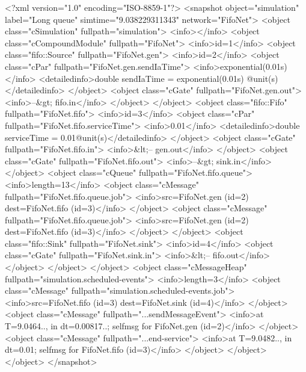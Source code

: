 \begin{filelisting}
<?xml version="1.0" encoding="ISO-8859-1"?>
<snapshot object="simulation" label="Long queue" simtime="9.038229311343"
network="FifoNet">
  <object class="cSimulation" fullpath="simulation">
    <info></info>
    <object class="cCompoundModule" fullpath="FifoNet">
      <info>id=1</info>
      <object class="fifo::Source" fullpath="FifoNet.gen">
        <info>id=2</info>
        <object class="cPar" fullpath="FifoNet.gen.sendIaTime">
          <info>exponential(0.01s)</info>
          <detailedinfo>double sendIaTime = exponential(0.01s) @unit(s)
          </detailedinfo>
        </object>
        <object class="cGate" fullpath="FifoNet.gen.out">
          <info>--&gt; fifo.in</info>
        </object>
      </object>
      <object class="fifo::Fifo" fullpath="FifoNet.fifo">
        <info>id=3</info>
        <object class="cPar" fullpath="FifoNet.fifo.serviceTime">
          <info>0.01</info>
          <detailedinfo>double serviceTime = 0.01@unit(s)</detailedinfo>
        </object>
        <object class="cGate" fullpath="FifoNet.fifo.in">
          <info>&lt;-- gen.out</info>
        </object>
        <object class="cGate" fullpath="FifoNet.fifo.out">
          <info>--&gt; sink.in</info>
        </object>
        <object class="cQueue" fullpath="FifoNet.fifo.queue">
          <info>length=13</info>
          <object class="cMessage" fullpath="FifoNet.fifo.queue.job">
            <info>src=FifoNet.gen (id=2)  dest=FifoNet.fifo (id=3)</info>
          </object>
          <object class="cMessage" fullpath="FifoNet.fifo.queue.job">
            <info>src=FifoNet.gen (id=2)  dest=FifoNet.fifo (id=3)</info>
          </object>
        </object>
      <object class="fifo::Sink" fullpath="FifoNet.sink">
        <info>id=4</info>
        <object class="cGate" fullpath="FifoNet.sink.in">
          <info>&lt;-- fifo.out</info>
        </object>
      </object>
    </object>
    <object class="cMessageHeap" fullpath="simulation.scheduled-events">
      <info>length=3</info>
      <object class="cMessage" fullpath="simulation.scheduled-events.job">
        <info>src=FifoNet.fifo (id=3)  dest=FifoNet.sink (id=4)</info>
      </object>
      <object class="cMessage" fullpath="...sendMessageEvent">
        <info>at T=9.0464.., in dt=0.00817..; selfmsg for FifoNet.gen (id=2)</info>
      </object>
      <object class="cMessage" fullpath="...end-service">
        <info>at T=9.0482.., in dt=0.01; selfmsg for FifoNet.fifo (id=3)</info>
      </object>
    </object>
  </object>
</snapshot>

\end{filelisting}



